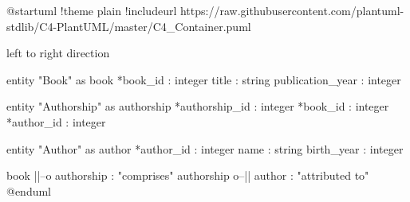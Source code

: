 @startuml
!theme plain
!includeurl https://raw.githubusercontent.com/plantuml-stdlib/C4-PlantUML/master/C4_Container.puml

left to right direction

entity "Book" as book {
  *book_id : integer
  title : string
  publication_year : integer
}

entity "Authorship" as authorship {
  *authorship_id : integer
  *book_id : integer
  *author_id : integer
}

entity "Author" as author {
  *author_id : integer
  name : string
  birth_year : integer
}

book ||--o{ authorship : "comprises"
authorship }o--|| author : "attributed to"
@enduml
